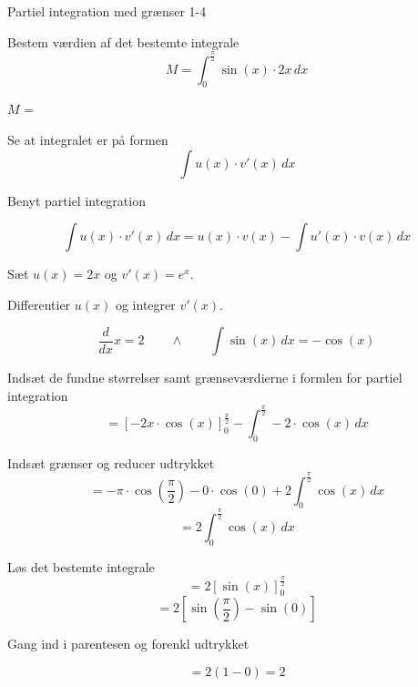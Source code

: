 \documentclass{article}
\begin{document}
\begin{exercise}{Partiel integration med grænser 1-4}


Bestem værdien af det bestemte integrale
\[
M = \int_0^{\frac{\pi}{2}} \sin(x) \cdot 2x \, dx
\]

$M$ = 


\hint

Se at integralet er på formen
\[
\int u(x) \cdot v'(x) \, dx
\]

\hint

Benyt partiel integration

\hint
\[
\int u(x) \cdot v'(x)\, dx = u(x) \cdot v(x) - \int u'(x) \cdot v(x) \, dx
\]
\hint

Sæt $u(x) = 2x$ og $v'(x) = e^x$.


\hint

Differentier $u(x)$ og integrer $v'(x)$.

\hint
\[
\frac{d}{dx}x = 2 \qquad \wedge \qquad \int \sin(x) \, dx = - \cos(x)
\]

\hint

Indsæt de fundne størrelser samt grænseværdierne i formlen for partiel integration
\[
= \left[-2x \cdot \cos(x) \right]_{0}^{\frac{\pi}{2}} - \int_{0}^{\frac{\pi}{2}} -2 \cdot \cos(x) \, dx
\]

\hint

Indsæt grænser og reducer udtrykket
\[
= - \pi \cdot \cos\left(\frac{\pi}{2}\right) - 0 \cdot \cos(0) + 2 \int_{0}^{\frac{\pi}{2}} \cos(x) \, dx
\]
\[
= 2 \int_{0}^{\frac{\pi}{2}} \cos(x) \, dx
\]

\hint
Løs det bestemte integrale
\[
= 2 \left[ \sin(x) \right]_0^{\frac{\pi}{2}}
\]
\[
= 2 \left[ \sin\left(\frac{\pi}{2}\right) - \sin(0) \right]
\]

\hint
Gang ind i parentesen og forenkl udtrykket

\hint
\[
= 2 ( 1 - 0) = 2
\]



\end{exercise}

\newpage
\end{document}
